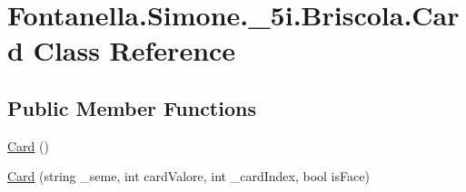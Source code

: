 \hypertarget{class_fontanella_1_1_simone_1_1__5i_1_1_briscola_1_1_card}{}\section{Fontanella.\+Simone.\+\_\+5i.\+Briscola.\+Card Class Reference}
\label{class_fontanella_1_1_simone_1_1__5i_1_1_briscola_1_1_card}
\subsection*{Public Member Functions}
\begin{DoxyCompactItemize}
\item 
\hyperlink{class_fontanella_1_1_simone_1_1__5i_1_1_briscola_1_1_card_a998d2e047284254fc568cbe8c2a49776}{Card} ()
\item 
\hyperlink{class_fontanella_1_1_simone_1_1__5i_1_1_briscola_1_1_card_a9a02483c6691e2a69cd4fd49d9587d1b}{Card} (string \+\_\+seme, int card\+Valore, int \+\_\+card\+Index, bool is\+Face)
\end{DoxyCompactItemize}
